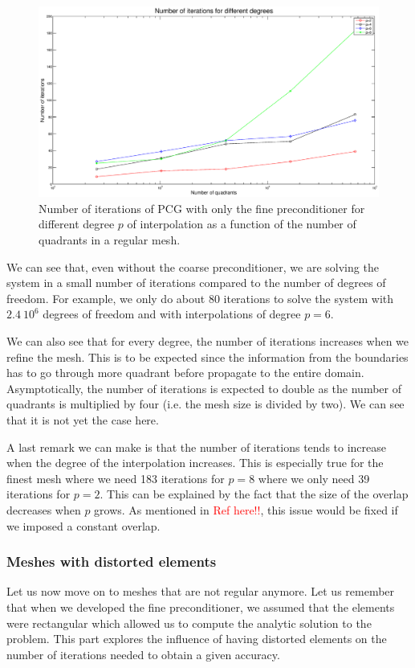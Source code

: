 \begin{figure}
\centering
\includegraphics[scale=0.35]{Results/fine_reg_iter.eps}
\caption{Number of iterations of PCG with only the fine preconditioner for different degree $p$ of interpolation as a function of the number of quadrants in a regular mesh.}
\label{fine_reg_iter} 
\end{figure}

We can see that, even without the coarse preconditioner, we are solving the system in a small number of iterations compared to the number of degrees of freedom. For example, we only do about 80 iterations to solve the system with $2.4\: 10^{6}$ degrees of freedom and with interpolations of degree $p=6$. 

 We can also see that for every degree, the number of iterations increases when we refine the mesh. This is to be expected since the information from the boundaries has to go through more quadrant before propagate to the entire domain. Asymptotically, the number of iterations is expected to double as the number of quadrants is multiplied by four (i.e. the mesh size is divided by two). We can see that it is not yet the case here.

A last remark we can make is that the number of iterations tends to increase when the degree of the interpolation increases. This is especially true for the finest mesh where we need 183 iterations for $p=8$ where we only need 39 iterations for $p=2$. This can be explained by the fact that the size of the overlap decreases when $p$ grows. As mentioned in \textcolor{red}{Ref here!!}, this issue would be fixed if we imposed a constant overlap.

\subsubsection{Meshes with distorted elements}
Let us now move on to meshes that are not regular anymore. Let us remember that when we developed the fine preconditioner, we assumed that the elements were rectangular which allowed us to compute the analytic solution to the problem. This part explores the influence of having distorted elements on the number of iterations needed to obtain a given accuracy. 

